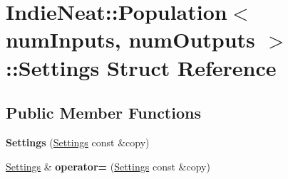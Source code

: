 \hypertarget{struct_indie_neat_1_1_population_1_1_settings}{}\section{Indie\+Neat\+:\+:Population$<$ num\+Inputs, num\+Outputs $>$\+:\+:Settings Struct Reference}
\label{struct_indie_neat_1_1_population_1_1_settings}
\subsection*{Public Member Functions}
\begin{DoxyCompactItemize}
\item 
\mbox{\label{struct_indie_neat_1_1_population_1_1_settings_ac2defa65f2152b868393d7a17e140f8c}} 
{\bfseries Settings} (\hyperlink{struct_indie_neat_1_1_population_1_1_settings}{Settings} const \&copy)
\item 
\mbox{\label{struct_indie_neat_1_1_population_1_1_settings_ad384b6f77208d8afd9bb360ee626e57a}} 
\hyperlink{struct_indie_neat_1_1_population_1_1_settings}{Settings} \& {\bfseries operator=} (\hyperlink{struct_indie_neat_1_1_population_1_1_settings}{Settings} const \&copy)
\end{DoxyCompactItemize}
